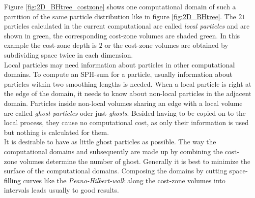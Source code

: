 Figure \ref{fig:2D_BHtree_costzone} shows one computational domain of such a partition of the same particle distribution like in figure \ref{fig:2D_BHtree}. The $21$ particles calculated in the current computational are called \emph{local particles} and are shown in green, the corresponding cost-zone volumes are shaded green. In this example the cost-zone depth is $2$ or the cost-zone volumes are obtained by subdividing space twice in each dimension. \\

Local particles may need information about particles in other computational domains. To compute an SPH-sum for a particle, usually information about particles within two smoothing lengths is needed. When a local particle is right at the edge of the domain, it needs to know about non-local particles in the adjacent domain. Particles inside non-local volumes sharing an edge with a local volume are called \emph{ghost particles} oder just \emph{ghosts}. Besided having to be copied on to the local process, they cause no computational cost, as only their information is used but nothing is calculated for them.\\

It is desirable to have as little ghost particles as possible. The way the computational domains and subsequently are made up by combining the cost-zone volumes determine the number of ghost. Generally it is best to minimize the surface of the computational domains. Composing the domains by cutting space-filling curves like the \emph{Peano-Hilbert-walk} along the cost-zone volumes into intervals leads usually to good results.\\

